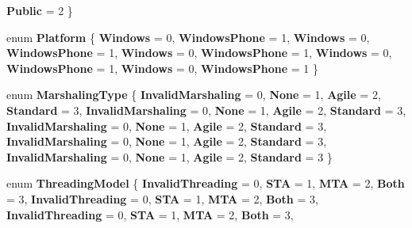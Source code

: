 \begin{DoxyCompactItemize}
{\bfseries Public} = 2
 \}
\item 
\mbox{\label{namespace_windows_1_1_foundation_1_1_metadata_ac74fec362ca55a3b5379960a1fde476d}} 
enum {\bfseries Platform} \{ \newline
{\bfseries Windows} = 0, 
{\bfseries Windows\+Phone} = 1, 
{\bfseries Windows} = 0, 
{\bfseries Windows\+Phone} = 1, 
\newline
{\bfseries Windows} = 0, 
{\bfseries Windows\+Phone} = 1, 
{\bfseries Windows} = 0, 
{\bfseries Windows\+Phone} = 1, 
\newline
{\bfseries Windows} = 0, 
{\bfseries Windows\+Phone} = 1
 \}
\item 
\mbox{\label{namespace_windows_1_1_foundation_1_1_metadata_af96a9466daa74933d167e8e5777f203f}} 
enum {\bfseries Marshaling\+Type} \{ \newline
{\bfseries Invalid\+Marshaling} = 0, 
{\bfseries None} = 1, 
{\bfseries Agile} = 2, 
{\bfseries Standard} = 3, 
\newline
{\bfseries Invalid\+Marshaling} = 0, 
{\bfseries None} = 1, 
{\bfseries Agile} = 2, 
{\bfseries Standard} = 3, 
\newline
{\bfseries Invalid\+Marshaling} = 0, 
{\bfseries None} = 1, 
{\bfseries Agile} = 2, 
{\bfseries Standard} = 3, 
\newline
{\bfseries Invalid\+Marshaling} = 0, 
{\bfseries None} = 1, 
{\bfseries Agile} = 2, 
{\bfseries Standard} = 3, 
\newline
{\bfseries Invalid\+Marshaling} = 0, 
{\bfseries None} = 1, 
{\bfseries Agile} = 2, 
{\bfseries Standard} = 3
 \}
\item 
\mbox{\label{namespace_windows_1_1_foundation_1_1_metadata_a4b7486fa60d9faccd8b65757f42b1aa1}} 
enum {\bfseries Threading\+Model} \{ \newline
{\bfseries Invalid\+Threading} = 0, 
{\bfseries S\+TA} = 1, 
{\bfseries M\+TA} = 2, 
{\bfseries Both} = 3, 
\newline
{\bfseries Invalid\+Threading} = 0, 
{\bfseries S\+TA} = 1, 
{\bfseries M\+TA} = 2, 
{\bfseries Both} = 3, 
\newline
{\bfseries Invalid\+Threading} = 0, 
{\bfseries S\+TA} = 1, 
{\bfseries M\+TA} = 2, 
{\bfseries Both} = 3, 
\newline

\end{DoxyCompactItemize}
